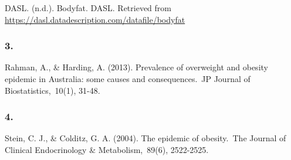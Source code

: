 \documentclass[a4paper,9pt,twocolumn,twoside,]{pinp}
\begin{document}
DASL. (n.d.). Bodyfat. DASL. Retrieved from
\url{https://dasl.datadescription.com/datafile/bodyfat}

\hypertarget{section-2}{%
\subsubsection{3.}\label{section-2}}

Rahman, A., \& Harding, A. (2013). Prevalence of overweight and obesity
epidemic in Australia: some causes and consequences.~JP Journal of
Biostatistics,~10(1), 31-48.

\hypertarget{section-3}{%
\subsubsection{4.}\label{section-3}}

Stein, C. J., \& Colditz, G. A. (2004). The epidemic of obesity.~The
Journal of Clinical Endocrinology \& Metabolism,~89(6), 2522-2525.





\end{document}
